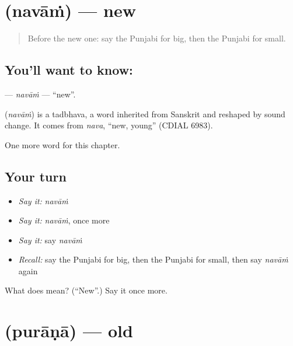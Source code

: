 \section[\texorpdfstring{\pa{ਨਵਾਂ} (navāṁ)}{ਨਵਾਂ (navāṁ)}]{ (navāṁ) — new}

\label{lesson:PA-C79-navam}



\begin{quote}
Before the new one: say the Punjabi for big, then the Punjabi for small.
\end{quote}

\subsection*{You'll want to know: }
\textbf{} — \emph{navāṁ} — \textquotedblleft{}new\textquotedblright{}.

\begin{cousinweb}
\textbf{} (\emph{navāṁ}) is a tadbhava, a word inherited from Sanskrit and reshaped by sound change. It comes from \emph{nava}, \textquotedblleft{}new, young\textquotedblright{} (CDIAL 6983).
\end{cousinweb}

\begin{grammarlens}[title={What you've built}]
One more word for this chapter.
\end{grammarlens}

\subsection*{Your turn}
\begin{itemize}
\raggedright
  \item \emph{Say it:} \emph{navāṁ}
  \item \emph{Say it:} \emph{navāṁ}, once more
  \item \emph{Say it:} say \emph{navāṁ}
  \item \emph{Recall:} say the Punjabi for big, then the Punjabi for small, then say \emph{navāṁ} again
\end{itemize}

\begin{tcolorbox}[breakable,colback=teal!4,colframe=teal!35!black,title={Before you move on}]
What does  mean? (\textquotedblleft{}New\textquotedblright{}.) Say it once more.
\end{tcolorbox}
\section[\texorpdfstring{\pa{ਪੁਰਾਣਾ} (purāṇā)}{ਪੁਰਾਣਾ (purāṇā)}]{ (purāṇā) — old}

